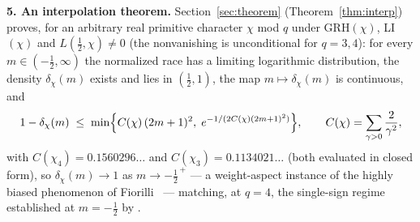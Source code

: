 \textbf{5. An interpolation theorem.} Section~\ref{sec:theorem}
(Theorem~\ref{thm:interp}) proves, for an arbitrary real primitive
character $\chi$ mod $q$ under GRH$(\chi)$, LI$(\chi)$ and
$L(\tfrac12,\chi)\ne0$ (the nonvanishing is unconditional for
$q=3,4$): for every $m\in(-\tfrac12,\infty)$ the
normalized race has a limiting logarithmic distribution, the density
$\delta_\chi(m)$ exists and lies in $(\tfrac12,1)$, the map
$m\mapsto\delta_\chi(m)$ is continuous, and
\[
1-\delta_\chi(m)\;\le\;\min\Bigl\{C(\chi)\,(2m+1)^2,\;
e^{-1/(2C(\chi)(2m+1)^2)}\Bigr\},\qquad
C(\chi)=\sum_{\gamma>0}\frac{2}{\gamma^2},
\]
with $C(\chi_4)=0.1560296\ldots$ and $C(\chi_3)=0.1134021\ldots$ (both
evaluated in closed form),
so $\delta_\chi(m)\to1$ as $m\to-\tfrac12^{\,+}$ --- a weight-aspect
instance of the highly biased phenomenon of Fiorilli~\cite{Fio14} ---
matching, at $q=4$, the single-sign
regime established at $m=-\tfrac12$ by \cite{AK23,Sheth24,Hay25}.

